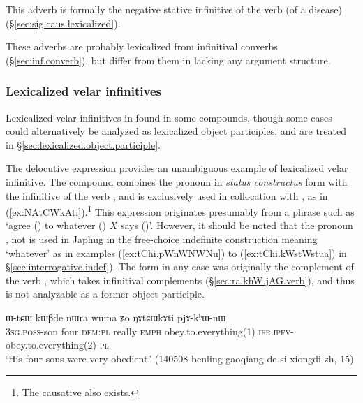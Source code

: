 This adverb is formally the negative stative infinitive of the verb  (of a disease) (§\ref{sec:sig.caus.lexicalized}).

These adverbs are probably lexicalized from infinitival converbs (§\ref{sec:inf.converb}), but differ from them in lacking any argument structure.
 
\subsubsection{Lexicalized velar infinitives}    \label{sec:lexicalized.velar.inf}
Lexicalized velar infinitives in  found in some compounds, though some cases could alternatively be analyzed as lexicalized object participles, and are treated in §\ref{sec:lexicalized.object.participle}.

The delocutive expression  provides an unambiguous example of lexicalized velar infinitive. The compound  combines the pronoun  in \textit{status constructus} form  with the  infinitive  of the verb , and is exclusively used in collocation with , as in (\ref{ex:NAtCWkAti}).\footnote{The causative  also exists.} 
This expression originates presumably from a phrase such as `agree () to whatever () $X$ says ()'. However, it should be noted that the pronoun , not  is used in Japhug in the free-choice indefinite construction meaning `whatever' as in examples (\ref{ex:tChi.pWnWNWNu}) to (\ref{ex:tChi.kWstWstua}) in §\ref{sec:interrogative.indef}). The form  in any case was originally the complement of the verb , which takes infinitival complements (§\ref{sec:ra.khW.jAG.verb}), and thus is not analyzable as a former object participle.

 \begin{exe}
\ex \label{ex:NAtCWkAti}
\gll  ɯ-tɕɯ kɯβde nɯra wuma ʑo ŋɤtɕɯkɤti pjɤ-kʰɯ-nɯ  \\
\textsc{3sg}.\textsc{poss}-son four \textsc{dem}:\textsc{pl} really \textsc{emph} obey.to.everything(1) \textsc{ifr}.\textsc{ipfv}-obey.to.everything(2)-\textsc{pl} \\
\glt `His four sons were very obedient.' (140508 benling gaoqiang de si xiongdi-zh, 15)
\end{exe} 

